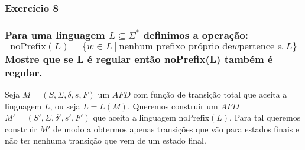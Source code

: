 \subsubsection{Exercício 8}

\subsubsection*{
  Para uma linguagem $L \subseteq \Sigma^*$ definimos a operação:
\[
  \textrm{noPrefix}(L) = \{w \in L \ | \ \textrm{nenhum prefixo próprio de} w \textrm{pertence a } L \}
\]
Mostre que se L é regular então noPrefix(L) também é regular.}

\begin{spacing}{1.5}
  Seja $M=(S,\Sigma,\delta,s,F)$ um $AFD$ com função de transição total que aceita a linguagem $L$, ou seja $L = L(M)$. Queremos construir um $AFD$ $M'=(S',\Sigma,\delta',s',F')$ que aceita a linguagem $\textrm{noPrefix}(L)$.
  Para tal queremos construir $M'$ de modo a obtermos apenas transições que vão para estados finais e não ter nenhuma transição que vem de um estado final. 
\end{spacing}